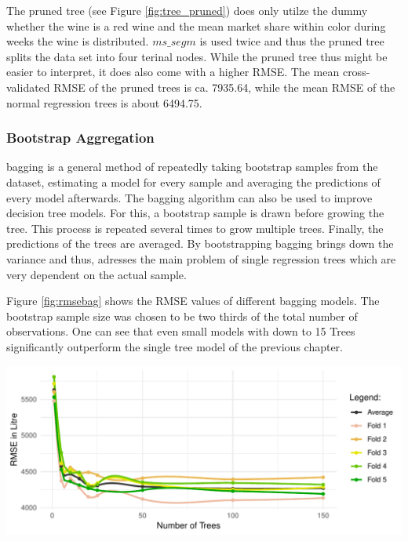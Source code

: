 \documentclass[11pt,]{article}
\let\origfigure\figure
\let\endorigfigure\endfigure
\renewenvironment{figure}[1][2] {
    \expandafter\origfigure\expandafter[H]
} {
    \endorigfigure
}
\begin{document}
The pruned tree (see Figure \ref{fig:tree_pruned}) does only utilze the
dummy whether the wine is a red wine and the mean market share within
color during weeks the wine is distributed. \(ms\_segm\) is used twice
and thus the pruned tree splits the data set into four terinal nodes.
While the pruned tree thus might be easier to interpret, it does also
come with a higher \ac{RMSE}. The mean cross-validated \ac{RMSE} of the
pruned trees is ca. 7935.64, while the mean \ac{RMSE} of the normal
regression trees is about 6494.75.

\hypertarget{bootstrap-aggregation}{%
\subsubsection{Bootstrap Aggregation}\label{bootstrap-aggregation}}

\ac{bagging} is a general method of repeatedly taking bootstrap samples
from the dataset, estimating a model for every sample and averaging the
predictions of every model afterwards. The \ac{bagging} algorithm can
also be used to improve decision tree models. For this, a bootstrap
sample is drawn before growing the tree. This process is repeated
several times to grow multiple trees. Finally, the predictions of the
trees are averaged. By bootstrapping \ac{bagging} brings down the
variance and thus, adresses the main problem of single regression trees
which are very dependent on the actual sample.

Figure \ref{fig:rmsebag} shows the \ac{RMSE} values of different
\ac{bagging} models. The bootstrap sample size was chosen to be two
thirds of the total number of observations. One can see that even small
models with down to 15 Trees significantly outperform the single tree
model of the previous chapter.

\begin{figure}

\includegraphics{../00_data/output_paper/14_bagging} \hfill{}

\caption[Bagging: RMSE's at Different Tree Sizes]{\label{fig:rmsebag}Bagging: RMSE's at Different Tree Sizes (Smoothed).}\label{fig:bag}
\end{figure}
\end{document}
